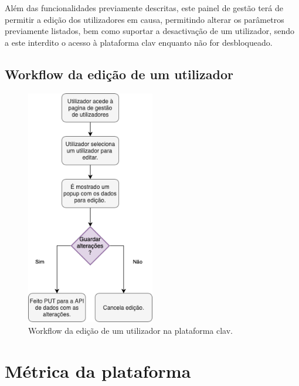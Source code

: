 Além das funcionalidades previamente descritas, este painel de gestão terá de permitir a edição dos utilizadores em causa, permitindo alterar os parâmetros previamente listados, bem como suportar a desactivação de um utilizador, sendo a este interdito o acesso à plataforma \gls{clav} enquanto não for desbloqueado.

\cleardoublepage
\subsection{Workflow da edição de um utilizador}

\begin{figure}[h!]
    \centering
    \includegraphics[width=0.5\textwidth]{img/diagramas/gestaometrica/Edicao.png}
    \caption{Workflow da edição de um utilizador na plataforma \gls{clav}.}
    \label{fig:flow_Edicao}
\end{figure}

\cleardoublepage
\section{Métrica da plataforma} \label{solucaoMetrica}
\vspace{-4mm}
